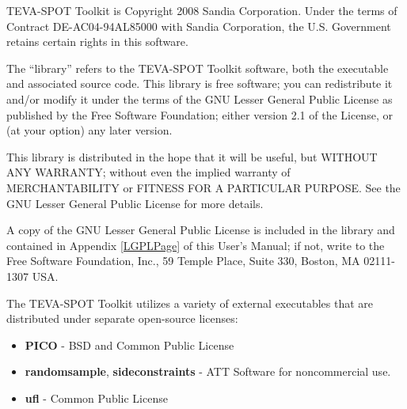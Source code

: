TEVA-SPOT Toolkit is Copyright 2008 Sandia Corporation. Under the
terms of Contract DE-AC04-94AL85000 with Sandia Corporation, the
U.S. Government retains certain rights in this software.

The ``library'' refers to the TEVA-SPOT Toolkit software, both the
executable and associated source code.  This library is free software;
you can redistribute it and/or modify it under the terms of the GNU Lesser
General Public License as published by the Free Software Foundation;
either version 2.1 of the License, or (at your option) any later version.

This library is distributed in the hope that it will be useful, but
WITHOUT ANY WARRANTY; without even the implied warranty of MERCHANTABILITY
or FITNESS FOR A PARTICULAR PURPOSE. See the GNU Lesser General Public
License for more details.

A copy of the GNU Lesser General Public License is included in the library
and contained in Appendix \ref{LGPLPage} of this User's Manual; if not,
write to the Free Software Foundation, Inc., 59 Temple Place, Suite 330,
Boston, MA 02111-1307 USA.

The TEVA-SPOT Toolkit utilizes a variety of external executables that
are distributed under separate open-source licenses:
\begin{itemize}

  \item {\bf PICO} - BSD and Common Public License

  \item {\bf randomsample}, {\bf sideconstraints} - ATT Software for noncommercial use.

  \item {\bf ufl} - Common Public License

\end{itemize}
  
